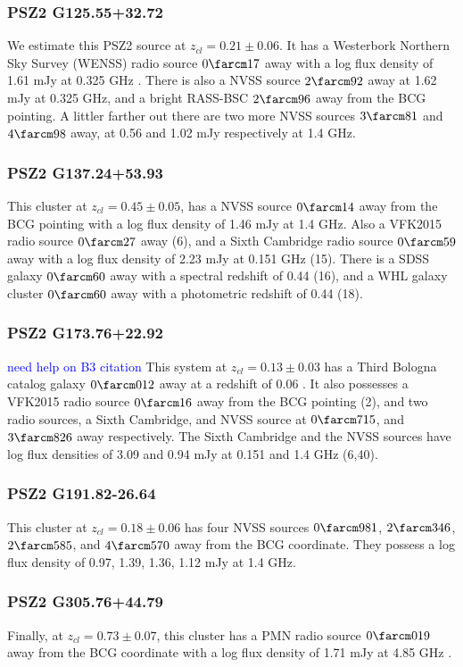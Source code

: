 \documentclass[apj, revtex4-1]{emulateapj}
\newcommand{\peditorial}[1]{\textcolor{blue}{#1}}
\begin{document}
\subsubsection{PSZ2 G125.55+32.72}
We estimate this PSZ2 source at $z_{cl} = 0.21 \pm 0.06$. It has a Westerbork Northern Sky Survey (WENSS) radio source $0\farcm17$ away with a log flux density of 1.61 mJy at 0.325 GHz \citep{Rengelink1997}. There is also a NVSS source $2\farcm92$ away at 1.62 mJy at 0.325 GHz, and a bright RASS-BSC $2\farcm96$ away from the BCG pointing. A littler farther out there are two more NVSS sources $3\farcm81$ and $4\farcm98$ away, at 0.56 and 1.02 mJy respectively at 1.4 GHz.

\subsubsection{PSZ2 G137.24+53.93}
This cluster at $z_{cl} = 0.45 \pm 0.05$, has a NVSS source $0\farcm14$ away from the BCG pointing with a log flux density of 1.46 mJy at 1.4 GHz. Also a VFK2015 radio source $0\farcm27$ away (6), and a Sixth Cambridge radio source $0\farcm59$ away with a log flux density of 2.23 mJy at 0.151 GHz (15). There is a SDSS galaxy $0\farcm60$ away with a spectral redshift of 0.44 (16), and a WHL galaxy cluster $0\farcm60$ away with a photometric redshift of 0.44 (18).

\subsubsection{PSZ2 G173.76+22.92}
\peditorial{need help on B3 citation}
This system at $z_{cl} = 0.13 \pm 0.03$ has a Third Bologna catalog galaxy $0\farcm012$ away at a redshift of 0.06 \citep{Ficarra1985}. It also possesses a VFK2015 radio source $0\farcm16$ away from the BCG pointing (2), and two radio sources, a Sixth Cambridge, and NVSS source at $0\farcm715$, and $3\farcm826$ away respectively. The Sixth Cambridge and the NVSS sources have log flux densities of 3.09 and 0.94 mJy at 0.151 and 1.4 GHz (6,40).

\subsubsection{PSZ2 G191.82-26.64}
This cluster at $z_{cl} = 0.18 \pm 0.06$ has four NVSS sources $0\farcm981$, $2\farcm346$, $2\farcm585$, and $4\farcm570$ away from the BCG coordinate. They possess a log flux density of 0.97, 1.39, 1.36, 1.12 mJy at 1.4 GHz.

\subsubsection{PSZ2 G305.76+44.79}
Finally, at $z_{cl} = 0.73 \pm 0.07$, this cluster has a PMN radio source $0\farcm019$ away from the BCG coordinate with a log flux density of 1.71 mJy at 4.85 GHz \citep{Griffith1993}.
\end{document}
